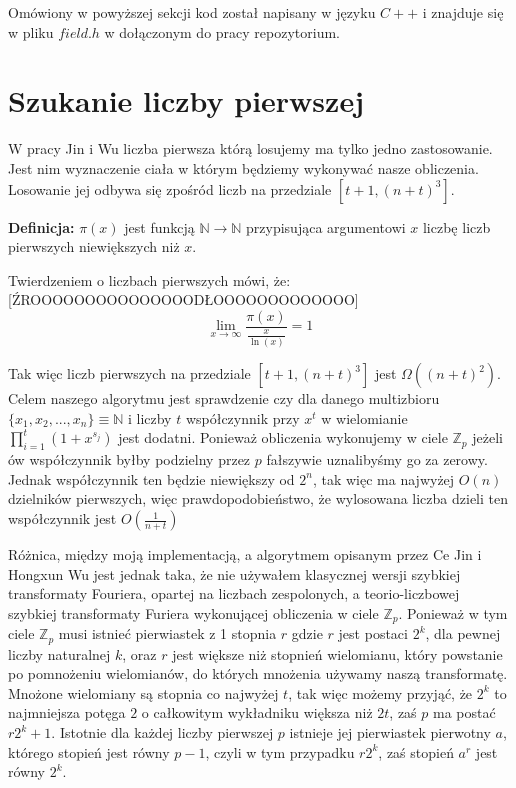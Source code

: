 \documentclass{article}
\begin{document}
Omówiony w powyższej sekcji kod został napisany w języku $C++$ i znajduje się w 
pliku $field.h$ w dołączonym do pracy repozytorium.


\section{Szukanie liczby pierwszej}
W pracy Jin i Wu liczba pierwsza którą losujemy ma tylko jedno zastosowanie. Jest nim
wyznaczenie ciała w którym będziemy wykonywać nasze obliczenia. Losowanie jej odbywa się 
zpośród liczb na przedziale $[t+1,(n+t)^3]$. 

\begin{tcolorbox}
        \textbf{Definicja:} $\pi(x)$ jest funkcją $\mathbb{N}\to\mathbb{N}$ przypisująca argumentowi $x$ liczbę 
        liczb pierwszych niewiększych niż $x$.
\end{tcolorbox}

Twierdzeniem o liczbach pierwszych mówi, że: [ŹROOOOOOOOOOOOOOODŁOOOOOOOOOOOOO] 
$$\lim_{x \to \infty} \frac{\pi(x)}{\frac{x}{\ln(x)}}=1$$

Tak więc liczb pierwszych na przedziale $[t+1,(n+t)^3]$ jest $\Omega((n+t)^2)$. Celem naszego algorytmu jest sprawdzenie
czy dla danego multizbioru $\{x_1,x_2,...,x_n\} \equiv \mathbb{N}$ i liczby $t$ współczynnik przy $x^t$ w wielomianie 
$\prod_{i=1}^{t}(1+x^{s_j})$ jest dodatni. Ponieważ obliczenia wykonujemy w ciele $\mathbb{Z}_p$ jeżeli 
ów współczynnik byłby podzielny przez $p$ fałszywie uznalibyśmy go za zerowy. Jednak współczynnik ten będzie 
niewiększy od $2^n$, tak więc ma najwyżej $O(n)$ dzielników pierwszych, więc prawdopodobieństwo, że wylosowana
liczba dzieli ten współczynnik jest $O(\frac{1}{n+t})$

Różnica, między moją implementacją, a algorytmem opisanym przez Ce Jin i Hongxun Wu jest 
jednak taka, że nie używałem klasycznej wersji szybkiej transformaty Fouriera, opartej na
liczbach zespolonych, a teorio-liczbowej szybkiej transformaty Furiera wykonującej obliczenia
w ciele $\mathbb{Z}_p$. Ponieważ w tym ciele $\mathbb{Z}_p$ musi istnieć pierwiastek z 1 stopnia $r$ gdzie
$r$ jest postaci $2^k$, dla pewnej liczby naturalnej $k$, oraz $r$ jest większe niż 
stopnień wielomianu, który powstanie po pomnożeniu wielomianów, do których mnożenia używamy naszą 
transformatę. Mnożone wielomiany są stopnia co najwyżej $t$, tak więc
możemy przyjąć, że $2^k$ to najmniejsza potęga $2$ o całkowitym wykładniku większa niż 
$2t$, zaś $p$ ma postać $r2^k+1$. Istotnie dla każdej liczby pierwszej $p$ istnieje jej pierwiastek pierwotny $a$,
którego stopień jest równy $p-1$, czyli w tym przypadku $r2^k$, zaś stopień $a^r$ jest równy $2^k$.
\end{document}

